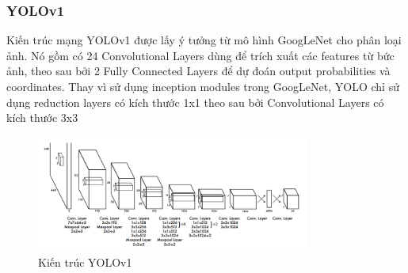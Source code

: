 \subsubsection{YOLOv1}
Kiến trúc mạng YOLOv1 được lấy ý tưởng từ mô hình GoogLeNet cho phân loại ảnh. Nó gồm có 24 Convolutional Layers dùng để trích xuất các features từ bức ảnh, theo sau bởi 2 Fully Connected Layers để dự đoán output probabilities và coordinates. Thay vì sử dụng inception modules trong GoogLeNet, YOLO chỉ sử dụng reduction layers có kích thước 1x1 theo sau bởi Convolutional Layers có kích thước 3x3 
\begin{figure}[htbp]
        \centering
        \includegraphics[width=0.8\textwidth]{images/2a-sign/yolo1_arch.png}
        \caption{Kiến trúc YOLOv1}
\end{figure}

